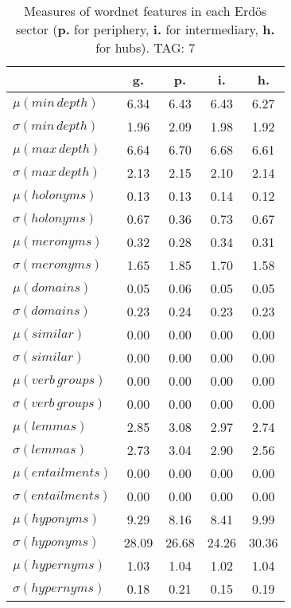\begin{table}[h!]
\begin{center}
\begin{tabular}{| l | c | c | c | c |}\hline
 & g. & p. & i. & h. \\\hline
$\mu(min\,depth)$ & 6.34  & 6.43  & 6.43  & 6.27 \\\hline
$\sigma(min\,depth)$ & 1.96  & 2.09  & 1.98  & 1.92 \\\hline
$\mu(max\,depth)$ & 6.64  & 6.70  & 6.68  & 6.61 \\\hline
$\sigma(max\,depth)$ & 2.13  & 2.15  & 2.10  & 2.14 \\\hline
$\mu(holonyms)$ & 0.13  & 0.13  & 0.14  & 0.12 \\\hline
$\sigma(holonyms)$ & 0.67  & 0.36  & 0.73  & 0.67 \\\hline
$\mu(meronyms)$ & 0.32  & 0.28  & 0.34  & 0.31 \\\hline
$\sigma(meronyms)$ & 1.65  & 1.85  & 1.70  & 1.58 \\\hline
$\mu(domains)$ & 0.05  & 0.06  & 0.05  & 0.05 \\\hline
$\sigma(domains)$ & 0.23  & 0.24  & 0.23  & 0.23 \\\hline
$\mu(similar)$ & 0.00  & 0.00  & 0.00  & 0.00 \\\hline
$\sigma(similar)$ & 0.00  & 0.00  & 0.00  & 0.00 \\\hline
$\mu(verb\,groups)$ & 0.00  & 0.00  & 0.00  & 0.00 \\\hline
$\sigma(verb\,groups)$ & 0.00  & 0.00  & 0.00  & 0.00 \\\hline
$\mu(lemmas)$ & 2.85  & 3.08  & 2.97  & 2.74 \\\hline
$\sigma(lemmas)$ & 2.73  & 3.04  & 2.90  & 2.56 \\\hline
$\mu(entailments)$ & 0.00  & 0.00  & 0.00  & 0.00 \\\hline
$\sigma(entailments)$ & 0.00  & 0.00  & 0.00  & 0.00 \\\hline
$\mu(hyponyms)$ & 9.29  & 8.16  & 8.41  & 9.99 \\\hline
$\sigma(hyponyms)$ & 28.09  & 26.68  & 24.26  & 30.36 \\\hline
$\mu(hypernyms)$ & 1.03  & 1.04  & 1.02  & 1.04 \\\hline
$\sigma(hypernyms)$ & 0.18  & 0.21  & 0.15  & 0.19 \\\hline
\end{tabular}
\caption{Measures of wordnet features in each Erd\"os sector ({{\bf p.}} for periphery, {{\bf i.}} for intermediary, {{\bf h.}} for hubs). TAG: 7}
\end{center}
\end{table}